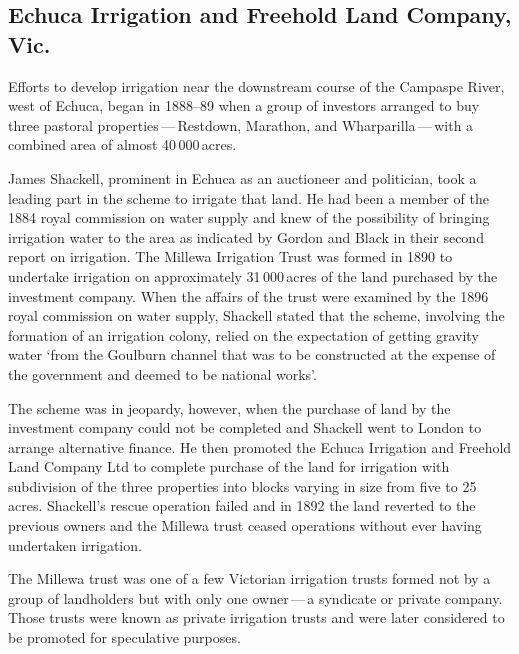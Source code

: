 \subsection*{Echuca Irrigation and Freehold Land Company, Vic.}

Efforts to develop irrigation near the downstream course of the
Campaspe River, west of Echuca, began in 1888--89 when a group of
investors arranged to buy three pastoral properties\,---\,Restdown,
Mara\-thon, and Wharparilla\,---\,with a combined area of almost
40\,000\,acres.

James Shackell,  prominent in Echuca as an
auctioneer and politician, took a leading part in the scheme to
irrigate that land.  He had been a member of the 1884 royal commission
on water supply and knew of the possibility of bringing irrigation
water to the area as indicated by Gordon and Black in their second
report on irrigation.  The Millewa Irrigation Trust
 was formed in 1890 to undertake
irrigation on approximately 31\,000\,acres of the land purchased by
the investment company.  When the affairs of the trust were examined
by the 1896 royal
commission on water supply, Shackell stated that the scheme, involving
the formation of an irrigation colony, relied on the expectation of
getting gravity water `from the Goulburn
channel that was to be constructed at the
expense of the government and deemed to be national
works'.

The scheme was in jeopardy, however, when the purchase of land by the
investment company could not be completed and Shackell went to London
to arrange alternative finance.  He then promoted the
Echuca Irrigation and Freehold Land Company Ltd to complete purchase
of the land for irrigation with subdivision of the three properties
into blocks varying in size from five to 25\,acres.  Shackell's rescue
operation failed and in 1892 the land reverted to the previous owners
and the Millewa trust ceased operations without ever having undertaken
irrigation.

The Millewa trust was one of a few Victorian irrigation trusts formed
not by a group of landholders but with only one owner\,---\,a syndicate
or private company.  Those trusts were known as private irrigation
trusts and were later considered to be promoted for speculative
purposes.

